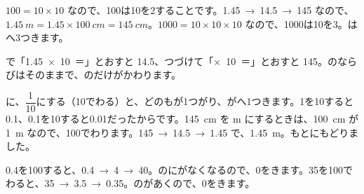 \par\vspace{2mm}
\par
$100=10\times10$ なので、100は10を2することです。\allowbreak\mbox{1.45 → 14.5}\allowbreak\mbox{ → 145} なので、$\qty{1.45}{m}=1.45\times\qty{100}{cm}=\qty{145}{cm}$。$1000=10\times10\times10$ なので、1000は10を3。はへ3つきます。

\noindent\begin{minipage}[c]{0.62\linewidth}
で\mbox{「1.45 × 10 ＝」}とおすと 14.5、つづけて\mbox{「× 10 ＝」}とおすと 145。のならびはそのままで、のだけがかわります。
\end{minipage}\hfill
\begin{minipage}[c]{0.35\linewidth}\centering
{}
\end{minipage}

\par\vspace{2mm}
\par
{}に、$\dfrac{1}{10}$にする（10でわる）と、どのもが1つがり、がへ1つきます。1を10すると0.1、0.1を10すると0.01だったからです。\qty{145}{cm} を m にするときは、\qty{100}{cm} が \qty{1}{m} なので、100でわります。\mbox{145 → 14.5 → 1.45} で、\qty{1.45}{m}。もとにもどりました。

\par\vspace{1mm}
\par
0.4を100すると、\mbox{0.4 → 4 → 40}。のにがなくなるので、0をきます。35を100でわると、\mbox{35 → 3.5 → 0.35}。のがあくので、0をきます。


